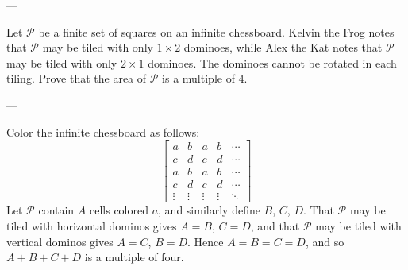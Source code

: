 
---

Let $\mathcal P$ be a finite set of squares on an infinite chessboard. Kelvin the Frog notes that $\mathcal P$ may be tiled with only $1\times2$ dominoes, while Alex the Kat notes that $\mathcal P$ may be tiled with only $2\times1$ dominoes. The dominoes cannot be rotated in each tiling. Prove that the area of $\mathcal P$ is a multiple of $4$.

---

Color the infinite chessboard as follows:
\[
    \begin{bmatrix}
        a&b&a&b&\cdots\\
        c&d&c&d&\cdots\\
        a&b&a&b&\cdots\\
        c&d&c&d&\cdots\\
        \vdots&\vdots&\vdots&\vdots&\ddots
    \end{bmatrix}
\]
Let $\mathcal P$ contain $A$ cells colored $a$, and similarly define $B$, $C$, $D$. That $\mathcal P$ may be tiled with horizontal dominos gives $A=B$, $C=D$, and that $\mathcal P$ may be tiled with vertical dominos gives $A=C$, $B=D$. Hence $A=B=C=D$, and so $A+B+C+D$ is a multiple of four.

